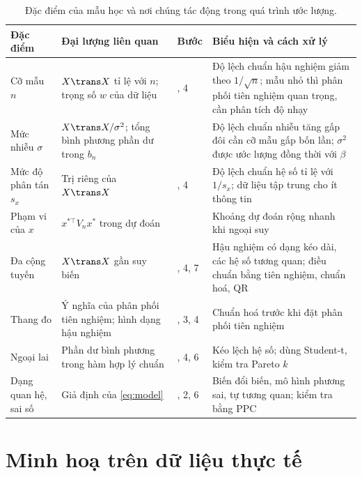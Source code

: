 \documentclass[12pt,a4paper]{report}
\begin{document}
\begin{table}[tp]
  \centering
  \small
  \caption{Đặc điểm của mẫu học và nơi chúng tác động trong quá trình ước
    lượng.}
  \label{tab:summary}
  \begin{tabular}{>{\raggedright\arraybackslash}p{3.0cm}
                  >{\raggedright\arraybackslash}p{4.4cm}
                  >{\raggedright\arraybackslash}p{2.2cm}
                  >{\raggedright\arraybackslash}p{6.6cm}}
    \toprule
    Đặc điểm & Đại lượng liên quan & Bước & Biểu hiện và cách xử lý \\
    \midrule
    Cỡ mẫu $n$ & $X\trans X$ tỉ lệ với $n$; trọng số $w$ của dữ liệu
      & 3, 4 & Độ lệch chuẩn hậu nghiệm giảm theo $1/\sqrt{n}$; mẫu nhỏ thì phân phối tiên nghiệm quan trọng, cần phân tích độ nhạy \\
    Mức nhiễu $\sigma$ & $X\trans X/\sigma^2$; tổng bình phương phần dư trong $b_n$
      & 4 & Độ lệch chuẩn nhiễu tăng gấp đôi cần cỡ mẫu gấp bốn lần; $\sigma^2$ được ước lượng đồng thời với $\beta$ \\
    Mức độ phân tán $s_x$ & Trị riêng của $X\trans X$
      & 1, 4 & Độ lệch chuẩn hệ số tỉ lệ với $1/s_x$; dữ liệu tập trung cho ít thông tin \\
    Phạm vi của $x$ & $x^{\ast\top} V_n x^\ast$ trong dự đoán
      & 7 & Khoảng dự đoán rộng nhanh khi ngoại suy \\
    Đa cộng tuyến & $X\trans X$ gần suy biến
      & 3, 4, 7 & Hậu nghiệm có dạng kéo dài, các hệ số tương quan; điều chuẩn bằng tiên nghiệm, chuẩn hoá, QR \\
    Thang đo & Ý nghĩa của phân phối tiên nghiệm; hình dạng hậu nghiệm
      & 1, 3, 4 & Chuẩn hoá trước khi đặt phân phối tiên nghiệm \\
    Ngoại lai & Phần dư bình phương trong hàm hợp lý chuẩn
      & 2, 4, 6 & Kéo lệch hệ số; dùng Student-t, kiểm tra Pareto $k$ \\
    Dạng quan hệ, sai số & Giả định của \eqref{eq:model}
      & 1, 2, 6 & Biến đổi biến, mô hình phương sai, tự tương quan; kiểm tra bằng PPC \\
    \bottomrule
  \end{tabular}
\end{table}

\chapter{Minh hoạ trên dữ liệu thực tế}
\label{sec:example}
\end{document}
